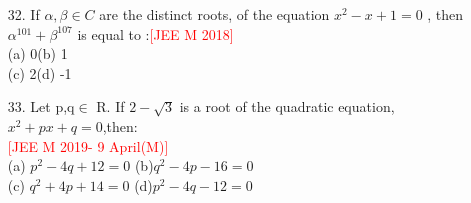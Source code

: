\documentclass[journal,12pt,twocolumn]{IEEEtran}
\theoremstyle{remark}
\begin{document}
\begin{enumerate}
\item[32.]If $\alpha,\beta\in C$ are the distinct roots, of the equation $x^2-x+1=0$ , then $\alpha^{101}+\beta^{107}$ is equal to :\hspace{3.8cm}\textcolor{red}{[JEE M 2018]}\\[6pt]
(a)  0\hspace{5cm}(b)  1\\[2pt]
(c)  2\hspace{5cm}(d)  -1\\[6pt]
\item[33.]Let p,q$\in$ R. If $2-\sqrt{3}$ is a root of the quadratic equation, $x^2+px+q=0$,then:\\[6pt]
\phantom{2cm}\hspace{2.8cm}\textcolor{red}{[JEE M 2019- 9 April(M)]}\\[6pt]
(a)  $p^2-4q+12=0$ \hspace{1cm}(b)$q^2-4p-16=0$\\[2pt]
(c)  $q^2+4p+14=0$ \hspace{1cm}(d)$p^2-4q-12=0$\\[6pt]

\bigskip

\renewcommand{\thefigure}{\theenumi}
\renewcommand{\thetable}{\theenumi}

\end{enumerate}
\end{document}
